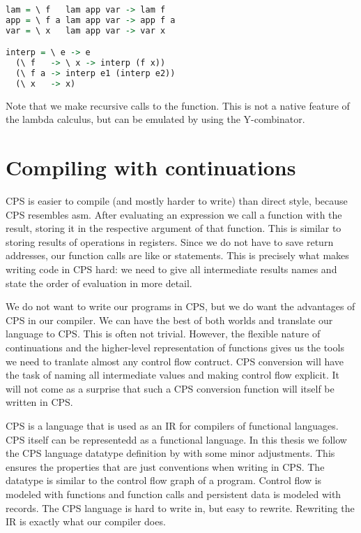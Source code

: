 \begin{lstlisting}[language=Haskell]
lam = \ f   lam app var -> lam f
app = \ f a lam app var -> app f a
var = \ x   lam app var -> var x

interp = \ e -> e 
  (\ f   -> \ x -> interp (f x))
  (\ f a -> interp e1 (interp e2))
  (\ x   -> x)
\end{lstlisting}

Note that we make recursive calls to the  function. This is not a native feature of the lambda calculus, but can be emulated by using the Y-combinator\autocite{barendregt1984lambda}.

\section{\label{section:cwc}Compiling with continuations}
\ac{CPS} is easier to compile (and mostly harder to write) than direct style, because \ac{CPS} resembles \ac{asm}. After evaluating an expression we call a function with the result, storing it in the respective argument of that function. This is similar to storing results of operations in registers. Since we do not have to save return addresses, our function calls are like  or  statements. This is precisely what makes writing code in \ac{CPS} hard: we need to give all intermediate results names and state the order of evaluation in more detail.

We do not want to write our programs in \ac{CPS}, but we do want the advantages of \ac{CPS} in our compiler. We can have the best of both worlds and translate our language to \ac{CPS}. This is often not trivial. However, the flexible nature of continuations and the higher-level representation of functions gives us the tools we need to tranlate almost any control flow contruct. \ac{CPS} conversion will have the task of naming all intermediate values and making control flow explicit. It will not come as a surprise that such a \ac{CPS} conversion function will itself be written in \ac{CPS}.

\ac{CPS} is a language that is used as an \ac{IR} for compilers of functional languages\autocite{steele1978rabbit, DBLP:books/daglib/0022396}. \ac{CPS} itself can be representedd as a functional language. In this thesis we follow the \ac{CPS} language datatype definition by \citeauthor{DBLP:books/daglib/0022396} with some minor adjustments. This ensures the properties that are just conventions when writing in \ac{CPS}. The datatype is similar to the control flow graph of a program. Control flow is modeled with functions and function calls and persistent data is modeled with records. The \ac{CPS} language is hard to write in, but easy to rewrite. Rewriting the \ac{IR} is exactly what our compiler does.


